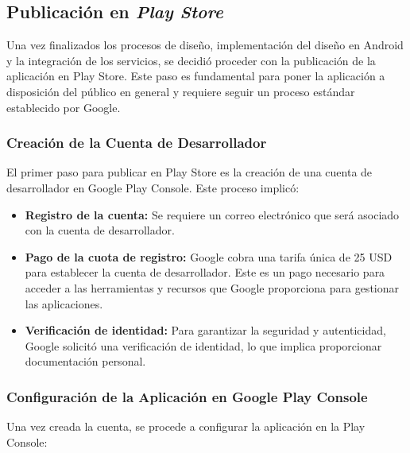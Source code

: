 
\subsection{Publicación en \textit{Play Store}}

Una vez finalizados los procesos de diseño, implementación del diseño en Android y la integración de los servicios, se decidió proceder con la publicación de la aplicación en Play Store. Este paso es fundamental para poner la aplicación a disposición del público en general y requiere seguir un proceso estándar establecido por Google.

\subsubsection{Creación de la Cuenta de Desarrollador}

El primer paso para publicar en Play Store es la creación de una cuenta de desarrollador en Google Play Console. Este proceso implicó:

\begin{itemize}
    \item \textbf{Registro de la cuenta:} Se requiere un correo electrónico que será asociado con la cuenta de desarrollador. 
    \item \textbf{Pago de la cuota de registro:} Google cobra una tarifa única de 25 USD para establecer la cuenta de desarrollador. Este es un pago necesario para acceder a las herramientas y recursos que Google proporciona para gestionar las aplicaciones.
    \item \textbf{Verificación de identidad:} Para garantizar la seguridad y autenticidad, Google solicitó una verificación de identidad, lo que implica proporcionar documentación personal.
\end{itemize}

\subsubsection{Configuración de la Aplicación en Google Play Console}

Una vez creada la cuenta, se procede a configurar la aplicación en la Play Console:


